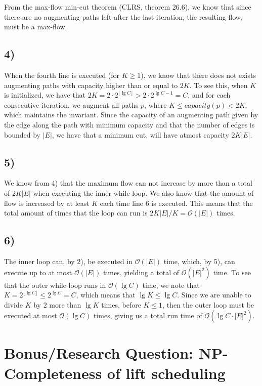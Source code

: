 \documentclass[a4paper]{article}
\begin{document}
From the max-flow min-cut theorem (CLRS, theorem 26.6), we know that since there are no augmenting paths left after the last iteration, the resulting flow, must be a max-flow.
\subsection*{4)}
When the fourth line is executed (for $K\geq 1$), we know that there does not exists augmenting paths with capacity higher than or equal to $2K$. To see this, when $K$ is initialized, we have that $2K= 2\cdot 2^{\lfloor \lg C \rfloor} > 2\cdot 2^{\lg C -1} = C$, and for each consecutive iteration, we augment all paths $p$, where $K\leq capacity(p)<2K$, which maintains the invariant. Since the capacity of an augmenting path given by the edge along the path with minimum capacity and that
the number of edges is bounded by $|E|$, we have that a minimum cut, will have atmost capacity $2K|E|$.
\subsection*{5)}
We know from 4) that the maximum flow can not increase by more than a total of $2K|E|$ when executing the inner while-loop. We also know that the amount of flow is increased by at least $K$ each time line 6 is executed. This means that the total amount of times that the loop can run is $2K|E|/K=\mathcal{O}(|E|)$ times.
\subsection*{6)}
The inner loop can, by 2), be executed in $\mathcal{O}(|E|)$ time, which, by 5), can execute up to at most $\mathcal{O}(|E|)$ times, yielding a total of $\mathcal{O}(|E|^2)$ time. To see that the outer while-loop runs in $\mathcal{O}(\lg C)$ time, we note that $K = 2^{\lfloor \lg C \rfloor} \leq 2^{\lg C}=C$, which means that $\lg K \leq \lg C$. Since we are unable to divide $K$ by $2$ more than $\lg K$ times, before $K\leq 1$, then the outer loop must be executed at most
$\mathcal{O}(\lg C)$ times, giving us a total run time of $\mathcal{O}(\lg C \cdot |E|^2)$.
\section{Bonus/Research Question: NP-Completeness of lift scheduling}
\end{document}
